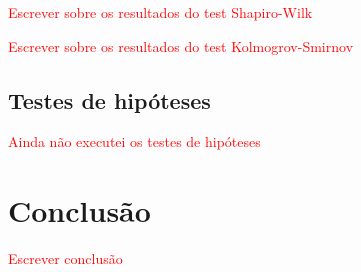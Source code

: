 \documentclass[conference]{IEEEtran}
\begin{document}
\textcolor{red}{Escrever sobre os resultados do test Shapiro-Wilk}

\textcolor{red}{Escrever sobre os resultados do test Kolmogrov-Smirnov}

\subsection{Testes de hipóteses}

\textcolor{red}{Ainda não executei os testes de hipóteses}

\section{Conclusão}
\label{sec:conclusao}

\textcolor{red}{Escrever conclusão}




% 

\end{document}
